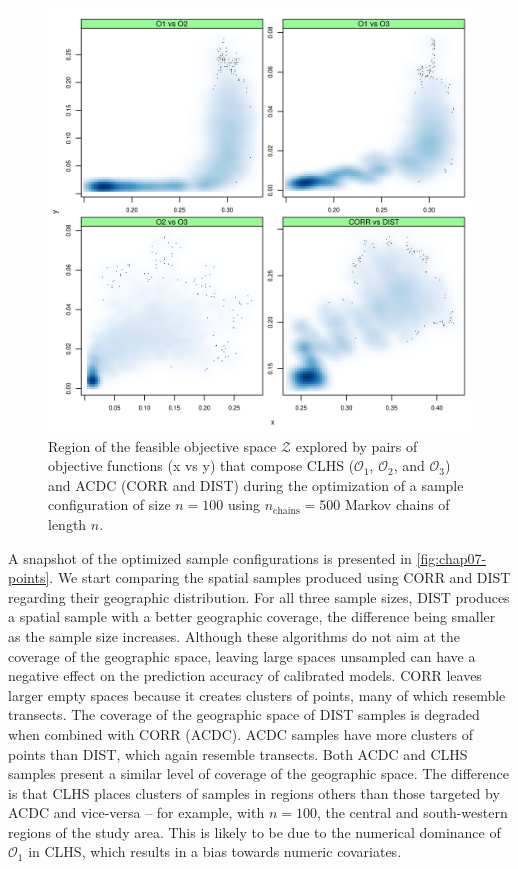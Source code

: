 \begin{figure}[!ht]
 \centering
 \includegraphics[width=\textwidth]{fig/chap07-energy-acdc-clhs}
 \caption[Region of the feasible objective space explored by pairs of objective functions that compose CLHS 
 and ACDC.]{Region of the feasible objective space $\mathcal{Z}$ explored by pairs of objective functions (x 
 vs  y) that compose CLHS ($\mathcal{O}_1$, $\mathcal{O}_2$, and $\mathcal{O}_3$) and ACDC (CORR and DIST)  
 during the optimization of a sample configuration of size $n = 100$ using $n_{\text{chains}} = 500$ Markov 
 chains of length $n$.}
 \label{fig:chap07-energy-acdc-clhs}
\end{figure}

A snapshot of the optimized sample configurations is presented in \autoref{fig:chap07-points}. We start 
comparing the spatial samples produced using CORR and DIST regarding their geographic distribution. For all 
three sample sizes, DIST produces a spatial sample with a better geographic coverage, the difference being 
smaller as the sample size increases. Although these algorithms do not aim at the coverage of the geographic 
space, leaving large spaces unsampled can have a negative effect on the prediction accuracy of calibrated 
models. CORR leaves larger empty spaces because it creates clusters of points, many of which resemble 
transects. The coverage of the geographic space of DIST samples is degraded when combined with CORR (ACDC). 
ACDC samples have more clusters of points than DIST, which again resemble transects. Both ACDC and CLHS 
samples present a similar level of coverage of the geographic space. The difference is that CLHS places 
clusters of samples in regions others than those targeted by ACDC and vice-versa -- for example, with $n = 
100$, the central and south-western regions of the study area. This is likely to be due to the numerical 
dominance of $\mathcal{O}_1$ in CLHS, which results in a bias towards numeric covariates.

